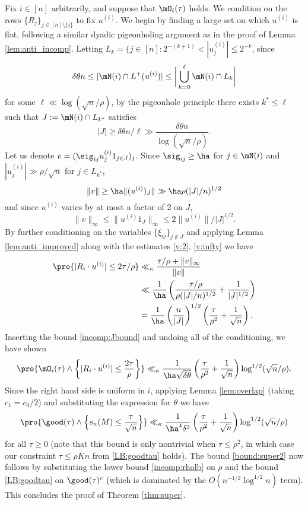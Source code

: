 \documentclass[aop,preprint]{imsart}
\theoremstyle{plain}
\theoremstyle{definition}
\theoremstyle{remark}
\numberwithin{equation}{section}
\numberwithin{theorem}{section}
\begin{document}
Fix $i\in [n]$ arbitrarily, and suppose that $\mO_i(\tau)$ holds.
We condition on the rows $\{R_{j}\}_{j\in [n]\setminus \{i\}}$ to fix $u^{(i)}$. 
We begin by finding a large set on which $u^{(i)}$ is flat, following a similar dyadic pigeonholing argument as in the proof of Lemma \ref{lem:anti_incomp}.
Letting $L_k = \{j\in [n]: 2^{-(k+1)} < |u^{(i)}_j| \le 2^{-k}$, since
\[
\delta \theta n \le |\mN(i) \cap L^+(u^{(i)})| \le  \bigg| \bigcup_{k=0}^{\ell} \mN(i)\cap L_k \bigg|
\]
for some $\ell \ll \log(\sqrt{n}/\rho)$, by the pigeonhole principle there exists $k^*\le \ell$ such that $J:= \mN(i)\cap L_{k^*}$ satisfies 
\begin{equation}	\label{incomp:Jbound}
|J| \ge \delta \theta n/\ell \gg \frac{\delta \theta n}{\log(\sqrt{n}/\rho)}.
\end{equation}
Let us denote $v= (\sig_{ij} u^{(i)}_j 1_{j\in J})_j$. 
Since $\sig_{ij} \ge \ha$ for $j\in \mN(i)$ and $|u_j^{(i)}|\gg \rho/\sqrt{n}$ for $j\in L_{k^*}$, 
\begin{equation}	\label{v:2}
\|v\| \ge \ha \|(u^{(i)})_J\| \gg \ha \rho (|J|/n)^{1/2}
\end{equation}
and since $u^{(i)}$ varies by at most a factor of $2$ on $J$, 
\begin{equation}	\label{v:infty}
\|v\|_\infty \le \|u^{(i)}1_{J}\|_\infty \le 2\|u^{(i)}\|/|J|^{1/2}.
\end{equation}
By further conditioning on the variables $\{\xi_{ij}\}_{j\notin J}$ and applying Lemma \ref{lem:anti_improved} along with the estimates \eqref{v:2}, \eqref{v:infty} we have
\begin{align*}
\pro{ |R_i\cdot u^{(i)}|\le 2\tau/\rho} 
&\ll_\kappa \frac{\tau/\rho + \|v\|_{\infty}}{\|v\|}\\
&\ll \frac{1}{\ha}\left(\frac{\tau/\rho}{\rho(|J|/n)^{1/2}} + \frac{1}{|J|^{1/2}}\right)\\
&= \frac{1}{\ha} \left(\frac{n}{|J|}\right)^{1/2} \left(\frac{\tau}{\rho^2} + \frac1{\sqrt{n}}\right). 
\end{align*}
Inserting the bound \eqref{incomp:Jbound} and undoing all of the conditioning, we have shown
\[
\pro{ \mO_i(\tau)\wedge \bigg\{ |R_i\cdot u^{(i)}|\le \frac{2\tau}{\rho}\bigg\}}
\ll_\kappa \frac{1}{\ha\sqrt{\delta \theta}} \left(\frac{\tau}{\rho^2} + \frac1{\sqrt{n}}\right) \log^{1/2}(\sqrt{n}/\rho).
\]
Since the right hand side is uniform in $i$, applying Lemma \ref{lem:overlap} (taking $c_1=c_0/2$) and substituting the expression for $\theta$ we have
\begin{equation}
\pro{\good(\tau)\wedge\Big\{ s_n(M)\le \frac{\tau}{\sqrt{n}}\Big\}} 
\ll_\kappa \frac{1}{\ha^4\delta^2} \left(\frac{\tau}{\rho^2} + \frac1{\sqrt{n}}\right) \log^{1/2}(\sqrt{n}/\rho)
\end{equation}
for all $\tau\ge0$ (note that this bound is only nontrivial when $\tau\le \rho^2$, in which case our constraint $\tau\le \rho Kn$ from \eqref{LB:goodtau} holds).
The bound \eqref{bound:super2} now follows by substituting the lower bound \eqref{incomp:rholb} on $\rho$ and the bound \eqref{LB:goodtau} on $\good(\tau)^c$ (which is dominated by the $O(n^{-1/2}\log^{1/2}n)$ term).
This concludes the proof of Theorem \ref{thm:super}.
\end{document}
